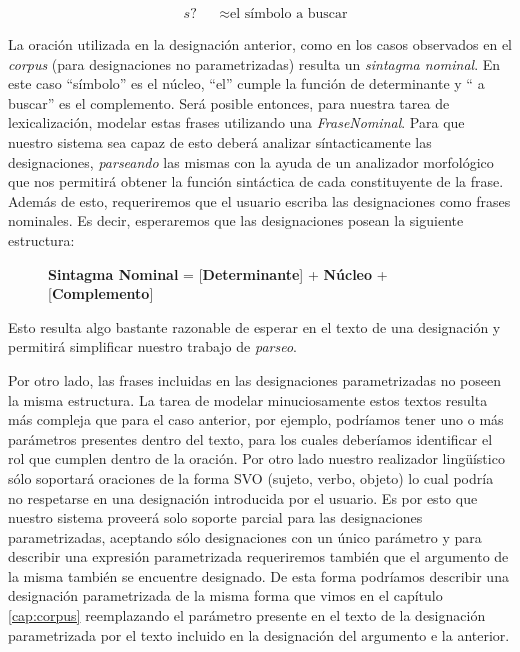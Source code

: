 \begin{figure}[H]
\begin{align*} 
  &s? && \approx \text{el símbolo a buscar}
\end{align*}
\end{figure}

La oración utilizada en la designación anterior, como en los casos observados en el \textit{corpus} (para designaciones no parametrizadas) resulta un \emph{sintagma nominal}. En este caso ``símbolo'' es el núcleo, ``el'' cumple la función de determinante y `` a buscar'' es el complemento. Será posible entonces, para nuestra tarea de lexicalización, modelar estas frases utilizando una \emph{FraseNominal}. Para que nuestro sistema sea capaz de esto deberá analizar síntacticamente las designaciones, \textit{parseando} las mismas con la ayuda de un analizador morfológico que nos permitirá obtener la función sintáctica de cada constituyente de la frase. Además de esto, requeriremos que el usuario escriba las designaciones como frases nominales. Es decir, esperaremos que las designaciones posean la siguiente estructura:

\begin{figure}[H]
  \centering
   \textbf{Sintagma Nominal} = [\textbf{Determinante}] + \textbf{Núcleo} + [\textbf{Complemento}]
\end{figure}

Esto resulta algo bastante razonable de esperar en el texto de una designación y permitirá simplificar nuestro trabajo de \emph{parseo}. 

Por otro lado, las frases incluidas en las designaciones parametrizadas no poseen la misma estructura. La tarea de modelar minuciosamente estos textos resulta más compleja que para el caso anterior, por ejemplo, podríamos tener uno o más parámetros presentes dentro del texto, para los cuales deberíamos identificar el rol que cumplen dentro de la oración. Por otro lado nuestro realizador lingüístico sólo soportará oraciones de la forma SVO (sujeto, verbo, objeto) lo cual podría no respetarse en una designación introducida por el usuario. Es por esto que nuestro sistema proveerá solo soporte parcial para las designaciones parametrizadas, aceptando sólo designaciones con un único parámetro y para describir una expresión parametrizada requeriremos también que el argumento de la misma también se encuentre designado. De esta forma podríamos describir una designación parametrizada de la misma forma que vimos en el capítulo \ref{cap:corpus} reemplazando el parámetro presente en el texto de la designación parametrizada por el texto incluido en la designación del argumento e la anterior.

